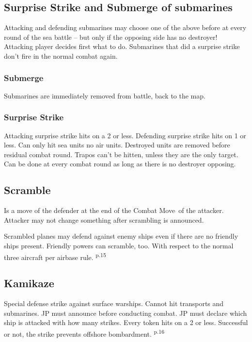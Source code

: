 \documentclass[10pt,twoside]{article}
\begin{document}
\begin{multicols*}{3}
\subsection*{Surprise Strike and Submerge of submarines}
Attacking and defending submarines may choose one of the above before at every round of the sea battle -- but only if the opposing side has no destroyer! Attacking player decides first what to do. Submarines that did a surprise strike don't fire in the normal combat again.

\subsubsection*{Submerge}
Submarines are immediately removed from battle, back to the map.

\subsubsection*{Surprise Strike}
Attacking surprise strike hits on a 2 or less. Defending surprise strike hits on 1 or less. Can only hit sea units no air units. Destroyed units are removed before residual combat round. Trapos can't be hitten, unless they are the only target. Can be done at every combat round as long as there is no destroyer opposing.

\subsection*{Scramble}
Is a move of the defender at the end of the \glqq Combat Move\grqq\ of the attacker. Attacker may not change something after scrambling is announced.

Scrambled planes may defend against enemy ships even if there are no friendly ships present. Friendly powers can scramble, too. With respect to the normal three aircraft per airbase rule. \textsuperscript{p.15}

\subsection*{Kamikaze}
Special defense strike against surface warships. Cannot hit transports and submarines. JP must announce before conducting combat. JP must declare which ship is attacked with how many strikes. Every token hits on a 2 or less. Successful or not, the strike prevents offshore bombardment. \textsuperscript{p.16}


\end{multicols*}
\end{document}
